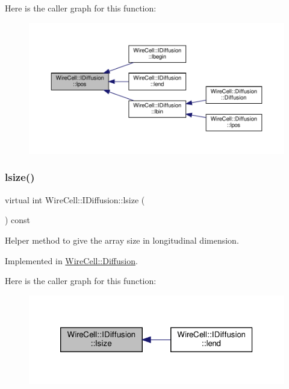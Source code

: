 Here is the caller graph for this function\+:
\nopagebreak
\begin{figure}[H]
\begin{center}
\leavevmode
\includegraphics[width=350pt]{class_wire_cell_1_1_i_diffusion_a6e85228ca6d4b6848bb8f80a1018a2aa_icgraph}
\end{center}
\end{figure}
\mbox{\label{class_wire_cell_1_1_i_diffusion_a877d15af9f833bc95a7943a0251289af}} 
\subsubsection{\texorpdfstring{lsize()}{lsize()}}
{\footnotesize\ttfamily virtual int Wire\+Cell\+::\+I\+Diffusion\+::lsize (\begin{DoxyParamCaption}{ }\end{DoxyParamCaption}) const\hspace{0.3cm}{\ttfamily [pure virtual]}}



Helper method to give the array size in longitudinal dimension. 



Implemented in \hyperlink{class_wire_cell_1_1_diffusion_aa590710356f717e695ebd9d49e3ef207}{Wire\+Cell\+::\+Diffusion}.

Here is the caller graph for this function\+:
\nopagebreak
\begin{figure}[H]
\begin{center}
\leavevmode
\includegraphics[width=320pt]{class_wire_cell_1_1_i_diffusion_a877d15af9f833bc95a7943a0251289af_icgraph}
\end{center}
\end{figure}
\mbox{\label{class_wire_cell_1_1_i_diffusion_ae1a5b7ca2e573661e358b604c9b3adfc}} 
